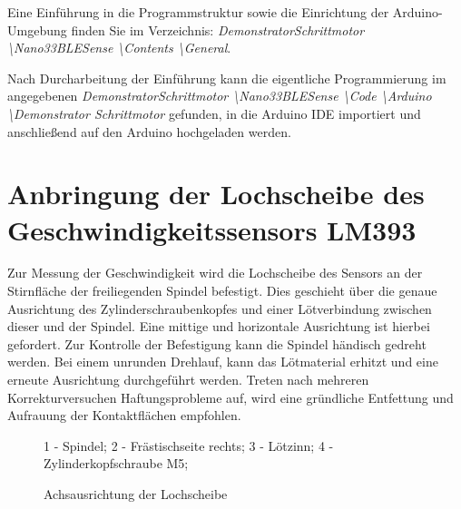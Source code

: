 Eine Einführung in die Programmstruktur sowie die Einrichtung der Arduino-Umgebung finden Sie im Verzeichnis:
\emph{DemonstratorSchrittmotor \textbackslash Nano33BLESense \textbackslash Contents \textbackslash General}.

Nach Durcharbeitung der Einführung kann die eigentliche Programmierung im angegebenen \emph{DemonstratorSchrittmotor \textbackslash Nano33BLESense \textbackslash Code \textbackslash Arduino \textbackslash Demonstrator Schrittmotor} gefunden, in die Arduino IDE importiert und anschließend auf den Arduino hochgeladen werden. 


\section{Anbringung der Lochscheibe des Geschwindigkeitssensors LM393}

Zur Messung der Geschwindigkeit wird die Lochscheibe des Sensors an der Stirnfläche der freiliegenden Spindel befestigt. Dies geschieht über die genaue Ausrichtung des Zylinderschraubenkopfes und einer Lötverbindung zwischen dieser und der Spindel. Eine mittige und horizontale Ausrichtung ist hierbei gefordert. Zur Kontrolle der Befestigung kann die Spindel händisch gedreht werden. Bei einem unrunden Drehlauf, kann das Lötmaterial erhitzt und eine erneute Ausrichtung durchgeführt werden. Treten nach mehreren Korrekturversuchen Haftungsprobleme auf, wird eine gründliche Entfettung und Aufrauung der Kontaktflächen empfohlen.


\begin{figure}[H]
	\vspace{0.5cm}
	\centering
	
	1 - Spindel; 2 - Frästischseite rechts; 3 - Lötzinn; 4 - Zylinderkopfschraube M5; 
	
	\caption{Achsausrichtung der Lochscheibe}
	\label{tikz:LScheibe}
\end{figure}

